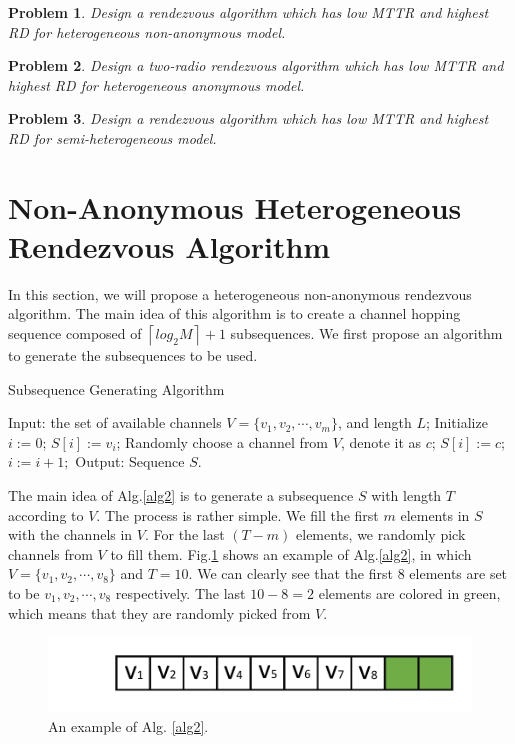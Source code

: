 \documentclass[10pt, conference, letterpaper]{IEEEtran}
\newtheorem{problem}{Problem}
\begin{document}
\begin{problem}
Design a rendezvous algorithm which has low MTTR and highest RD for heterogeneous non-anonymous model.
\end{problem}

\begin{problem}
Design a two-radio rendezvous algorithm which has low MTTR and highest RD for heterogeneous anonymous  model.
\end{problem}


\begin{problem}
Design a rendezvous algorithm which has low MTTR and highest RD for semi-heterogeneous model.
\end{problem}

\section{Non-Anonymous Heterogeneous Rendezvous Algorithm}
In this section, we will propose a heterogeneous non-anonymous rendezvous algorithm.
The main idea of this algorithm is to create a channel hopping sequence composed of $\left \lceil log_2 M \right \rceil + 1$ subsequences. We first propose an algorithm to generate the subsequences to be used.

\begin{algorithm}
\caption{Subsequence Generating Algorithm}
\label{alg2}
\begin{algorithmic}[1]
\STATE Input: the set of available channels $V=\{v_1,v_2,\cdots,v_m\}$, and length $L$;
\STATE Initialize $i :=0$;
\STATE $S[i] := v_i$;
\ELSE
\STATE Randomly choose a channel from $V$, denote it as $c$;
\STATE $S[i] := c$;
\ENDIF
\STATE $i:=i+1;$
\ENDWHILE
\STATE Output: Sequence $S$.
\end{algorithmic}
\end{algorithm}

The main idea of Alg.\ref{alg2} is to generate a subsequence $S$ with length $T$ according to $V$. The process is rather simple. We fill the first $m$ elements in $S$ with the channels in $V$. For the last $(T-m)$ elements, we randomly pick channels from $V$ to fill them. Fig.{\ref{exp-seq}} shows an example of Alg.\ref{alg2}, in which $V=\{v_1,v_2,\cdots,v_8\}$ and $T=10$. We can clearly see that the first 8 elements are set to be $v_1,v_2,\cdots,v_8$ respectively. The last $10-8=2$ elements are colored in green, which means that they are randomly picked from $V$.

\begin{figure}[!t]
\centering
\includegraphics[width=1\columnwidth]{seq}
\caption{An example of Alg. {\ref{alg2}}.}
\label{exp-seq}
\end{figure}
\end{document}
